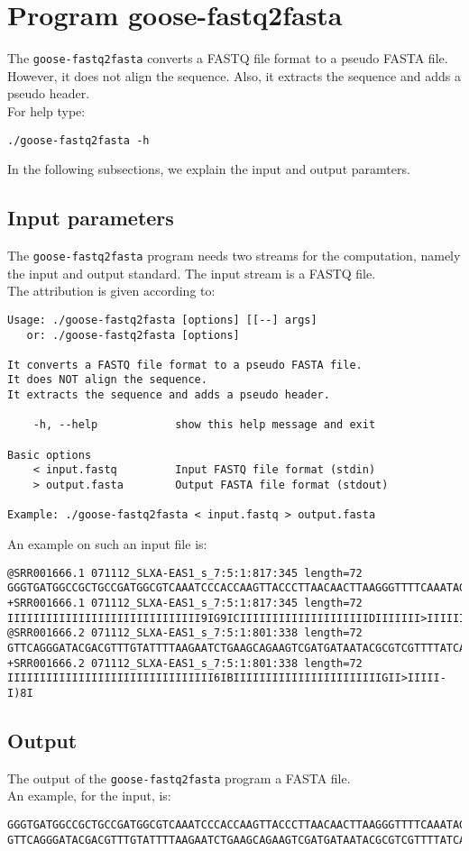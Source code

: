 \section{Program goose-fastq2fasta}
The \texttt{goose-fastq2fasta} converts a FASTQ file format to a pseudo FASTA file. However, it does not align the sequence. Also, it extracts the sequence and adds a pseudo header.\\
For help type:
\begin{lstlisting}
./goose-fastq2fasta -h
\end{lstlisting}
In the following subsections, we explain the input and output paramters.

\subsection*{Input parameters}

The \texttt{goose-fastq2fasta} program needs two streams for the computation,
namely the input and output standard. The input stream is a FASTQ file.\\
The attribution is given according to:
\begin{lstlisting}
Usage: ./goose-fastq2fasta [options] [[--] args]
   or: ./goose-fastq2fasta [options]

It converts a FASTQ file format to a pseudo FASTA file.
It does NOT align the sequence.
It extracts the sequence and adds a pseudo header.

    -h, --help            show this help message and exit

Basic options
    < input.fastq         Input FASTQ file format (stdin)
    > output.fasta        Output FASTA file format (stdout)

Example: ./goose-fastq2fasta < input.fastq > output.fasta
\end{lstlisting}
An example on such an input file is:
\begin{lstlisting}
@SRR001666.1 071112_SLXA-EAS1_s_7:5:1:817:345 length=72
GGGTGATGGCCGCTGCCGATGGCGTCAAATCCCACCAAGTTACCCTTAACAACTTAAGGGTTTTCAAATAGA
+SRR001666.1 071112_SLXA-EAS1_s_7:5:1:817:345 length=72
IIIIIIIIIIIIIIIIIIIIIIIIIIIIII9IG9ICIIIIIIIIIIIIIIIIIIIIDIIIIIII>IIIIII/
@SRR001666.2 071112_SLXA-EAS1_s_7:5:1:801:338 length=72
GTTCAGGGATACGACGTTTGTATTTTAAGAATCTGAAGCAGAAGTCGATGATAATACGCGTCGTTTTATCAT
+SRR001666.2 071112_SLXA-EAS1_s_7:5:1:801:338 length=72
IIIIIIIIIIIIIIIIIIIIIIIIIIIIIIII6IBIIIIIIIIIIIIIIIIIIIIIIIGII>IIIII-I)8I
\end{lstlisting}

\subsection*{Output}
The output of the \texttt{goose-fastq2fasta} program a FASTA file.\\
An example, for the input, is:
\begin{lstlisting}
GGGTGATGGCCGCTGCCGATGGCGTCAAATCCCACCAAGTTACCCTTAACAACTTAAGGGTTTTCAAATAGA
GTTCAGGGATACGACGTTTGTATTTTAAGAATCTGAAGCAGAAGTCGATGATAATACGCGTCGTTTTATCAT
\end{lstlisting}
